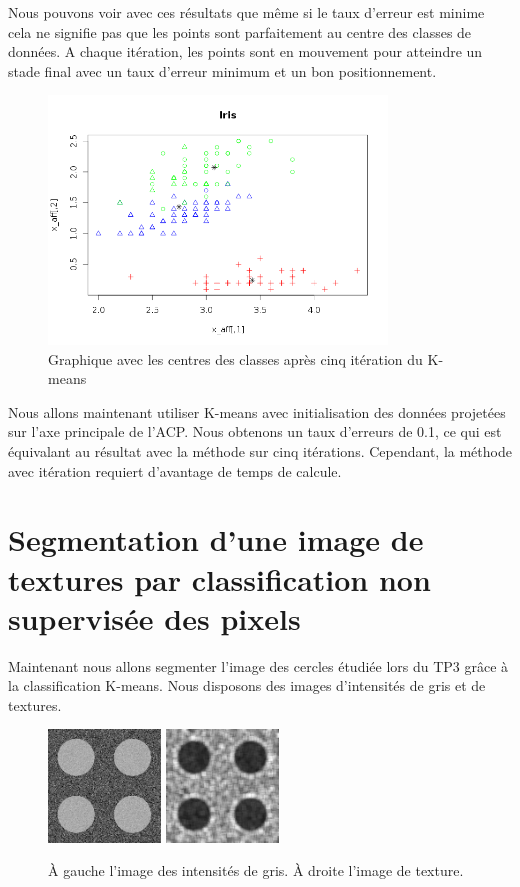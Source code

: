 \documentclass[a4paper,11pt]{article}
\begin{document}
  Nous pouvons voir avec ces résultats que même si le taux d'erreur est minime cela ne signifie pas
  que les points sont parfaitement au centre des classes de données. A chaque itération, les points
  sont en mouvement pour atteindre un stade final avec un taux d'erreur minimum et un bon positionnement.
 
  \begin{figure}[H]
    \center
    \includegraphics[width=9cm]{resultat/5_ite.png}
    \caption{Graphique avec les centres des classes après cinq itération du K-means}
  \end{figure}
  
  Nous allons maintenant utiliser K-means avec initialisation des données projetées sur l'axe principale
  de l'ACP. Nous obtenons un taux d'erreurs de 0.1, ce qui est équivalant au résultat avec la méthode
  sur cinq itérations. Cependant, la méthode avec itération requiert d'avantage de temps de calcule.
  
  
  \section{Segmentation d'une image de textures par classification non supervisée des pixels}
  Maintenant nous allons segmenter l'image des cercles étudiée lors du TP3 grâce à la classification
  K-means. Nous disposons des images d'intensités de gris et de textures.
  
  \begin{figure}[H]
    \center
    \includegraphics[width=3cm]{resultat/rdf-2-classes-texture-1.png}
    \includegraphics[width=3cm]{resultat/rdf-2-classes-texture-1-text.png}
    \caption{À gauche l'image des intensités de gris. À droite l'image de texture.}
  \end{figure}
  
\end{document}
